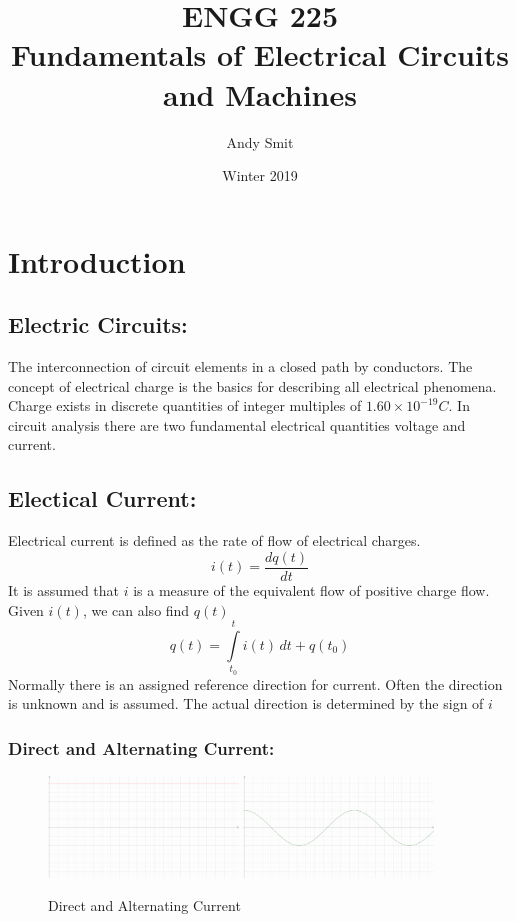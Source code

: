 \documentclass[14pt]{article}
\author{Andy Smit}
\title{ENGG 225\\Fundamentals of Electrical Circuits and Machines}
\date{Winter 2019}
\begin{document}
    \maketitle
    \section{Introduction}
    \subsection{Electric Circuits:}
    The interconnection of circuit elements in a closed path by conductors. 
    The concept of electrical charge is the basics for describing all electrical phenomena. Charge exists in discrete quantities of integer multiples of $1.60\times 10^{-19}C$. In circuit analysis there are two fundamental electrical quantities voltage and current. 
    \subsection{Electical Current:}
    Electrical current is defined as the rate of flow of electrical charges.
    $$i(t)=\frac{d q(t)}{dt}$$
    It is assumed that $i$ is a measure of the equivalent flow of positive charge flow. Given $i(t)$, we can also find $q(t)$
    $$q(t)=\int\limits_{t_0}^t i(t)\, dt+q(t_0)$$
    Normally there is an assigned reference direction for current. Often the direction is unknown and is assumed. The actual direction is determined by the sign of $i$
    \subsubsection{Direct and Alternating Current:}
    \begin{figure}[h]
        \includegraphics[width=0.45\textwidth]{DirCur.eps}
        \hspace{0.09\textwidth}
        \includegraphics[width=0.45\textwidth]{AltCur.eps}
        \caption{Direct and Alternating Current}
    \end{figure}
\end{document}
